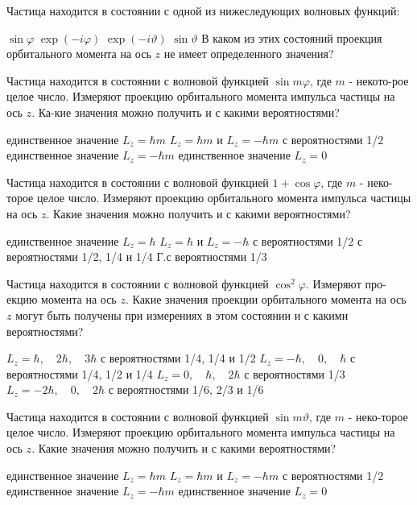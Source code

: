 \documentclass[11pt,a4paper]{exam}
\begin{document}
\begin{questions}
\question Частица находится в состоянии с одной из нижеследующих волновых функций:
\begin{choices}
\choice $\sin \varphi $      
\choice $\exp ( - i\varphi )$      
\choice $\exp ( - i\vartheta )$    
\choice $\sin \vartheta $
В каком из этих состояний проекция орбитального момента на ось $z$ не имеет определенного значения?
\end{choices}

\question Частица находится в состоянии с волновой функцией $\sin m\varphi $, где $m$ - некото-рое целое число. Измеряют проекцию орбитального момента импульса частицы на ось $z$. Ка-кие значения можно получить и с какими вероятностями?
\begin{choices}
\choice единственное значение ${L_z} = \hbar m$         
\choice ${L_z} = \hbar m$ и ${L_z} =  - \hbar m$ с вероятностями 1/2
\choice единственное значение ${L_z} =  - \hbar m$      
\choice единственное значение ${L_z} = 0$ 
\end{choices}

\question Частица находится в состоянии с волновой функцией $1 + \cos \varphi $, где $m$ - неко-торое целое число. Измеряют проекцию орбитального момента импульса частицы на ось $z$. Какие значения можно получить и с какими вероятностями?
\begin{choices}
\choice единственное значение ${L_z} = \hbar $
\choice ${L_z} = \hbar $ и ${L_z} =  - \hbar $ с вероятностями 1/2
\choice  с вероятностями 1/2, 1/4 и 1/4
Г.с вероятностями 1/3 
\end{choices}

\question Частица находится в состоянии с волновой функцией ${\cos ^2}\varphi $. Измеряют про-екцию момента на ось $z$. Какие значения проекции орбитального момента на ось $z$ могут быть получены при измерениях в этом состоянии и с какими вероятностями?
\begin{choices}
\choice ${L_z} = \hbar ,\quad 2\hbar ,\quad 3\hbar $ с вероятностями 1/4, 1/4 и 1/2
\choice ${L_z} =  - \hbar ,\quad 0,\quad \hbar $ с вероятностями 1/4, 1/2 и 1/4
\choice ${L_z} = 0,\quad \hbar ,\quad 2\hbar $ с вероятностями 1/3
\choice ${L_z} =  - 2\hbar ,\quad 0,\quad 2\hbar $ с вероятностями 1/6, 2/3 и 1/6
\end{choices}

\question Частица находится в состоянии с волновой функцией $\sin m\vartheta $, где $m$ - неко-торое целое число. Измеряют проекцию орбитального момента импульса частицы на ось $z$. Какие значения можно получить и с какими вероятностями?
\begin{choices}
\choice единственное значение ${L_z} = \hbar m$
\choice ${L_z} = \hbar m$ и ${L_z} =  - \hbar m$ с вероятностями 1/2
\choice единственное значение ${L_z} =  - \hbar m$
\choice единственное значение ${L_z} = 0$ 
\end{choices}


\end{questions}
\end{document}
